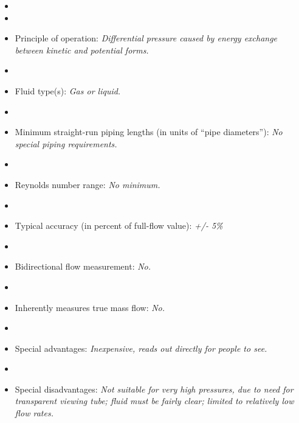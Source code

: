 \begin{itemize}
\goodbreak
\item{} 
\vskip 5pt
\item\item{} Principle of operation: {\it Differential pressure caused by energy exchange between kinetic and potential forms.}
\vskip 5pt
\item\item{} Fluid type(s): {\it Gas or liquid.}
\vskip 5pt
\item\item{} Minimum straight-run piping lengths (in units of ``pipe diameters''): {\it No special piping requirements.}
\vskip 5pt
\item\item{} Reynolds number range: {\it No minimum.}
\vskip 5pt
\item\item{} Typical accuracy (in percent of full-flow value): {\it +/- 5\%}
\vskip 5pt
\item\item{} Bidirectional flow measurement: {\it No.}
\vskip 5pt
\item\item{} Inherently measures true mass flow: {\it No.}
\vskip 5pt
\item\item{} Special advantages: {\it Inexpensive, reads out directly for people to see.}
\vskip 5pt
\item\item{} Special disadvantages: {\it Not suitable for very high pressures, due to need for transparent viewing tube; fluid must be fairly clear; limited to relatively low flow rates.}
\end{itemize}

